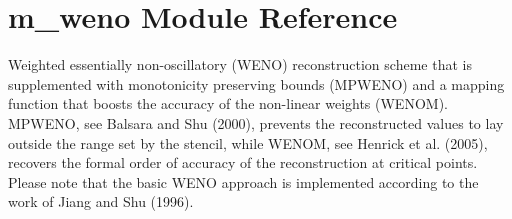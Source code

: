 \hypertarget{namespacem__weno}{}\section{m\+\_\+weno Module Reference}
\label{namespacem__weno}


Weighted essentially non-\/oscillatory (W\+E\+NO) reconstruction scheme that is supplemented with monotonicity preserving bounds (M\+P\+W\+E\+NO) and a mapping function that boosts the accuracy of the non-\/linear weights (W\+E\+N\+OM). M\+P\+W\+E\+NO, see Balsara and Shu (2000), prevents the reconstructed values to lay outside the range set by the stencil, while W\+E\+N\+OM, see Henrick et al. (2005), recovers the formal order of accuracy of the reconstruction at critical points. Please note that the basic W\+E\+NO approach is implemented according to the work of Jiang and Shu (1996).  


